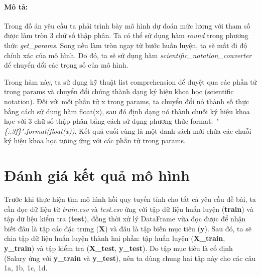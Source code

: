\documentclass[]{article}
\begin{document}
\paragraph{Mô tả:}

Trong đồ án yêu cầu ta phải trình bày mô hình dự đoán mức lương với tham số được làm tròn 3 chữ số thập phân. Ta có thể sử dụng hàm \textit{round} trong phương thức \textit{get\_params}. Song nếu làm tròn ngay từ bước huấn luyện, ta sẽ mất đi độ chính xác của mô hình. Do đó, ta sẽ sử dụng hàm \textit{scientific\_notation\_converter} để chuyển đổi các trọng số của mô hình.

Trong hàm này, ta sử dụng kỹ thuật list comprehension để duyệt qua các phần tử trong params và chuyển đổi chúng thành dạng ký hiệu khoa học (scientific notation). Đối với mỗi phần tử x trong params, ta chuyển đổi nó thành số thực bằng cách sử dụng hàm float(x), sau đó định dạng nó thành chuỗi ký hiệu khoa học với 3 chữ số thập phân bằng cách sử dụng phương thức format: \textit{"\{:.3f\}".format(float(x))}. Kết quả cuối cùng là một danh sách mới chứa các chuỗi ký hiệu khoa học tương ứng với các phần tử trong params.

\section{Đánh giá kết quả mô hình}

Trước khi thực hiện tìm mô hình hồi quy tuyến tính cho tất cả yêu cầu đề bài, ta cần đọc dữ liệu từ \textit{train.csv} và \textit{test.csv} ứng với tập dữ liệu huấn luyện (\textbf{train}) và tập dữ liệu kiểm tra (\textbf{test}), đồng thời xử lý DataFrame vừa đọc được để nhận biết đâu là tập các đặc trưng (\textbf{X}) và đâu là tập biến mục tiêu (\textbf{y}). Sau đó, ta sẽ chia tập dữ liệu huấn luyện thành hai phần: tập huấn luyện (\textbf{X\_train}, \textbf{y\_train}) và tập kiểm tra (\textbf{X\_test}, \textbf{y\_test}). Do tập mục tiêu là cố định (Salary ứng với \textbf{y\_train} và \textbf{y\_test}), nên ta dùng chung hai tập này cho các câu 1a, 1b, 1c, 1d. 
\end{document}
